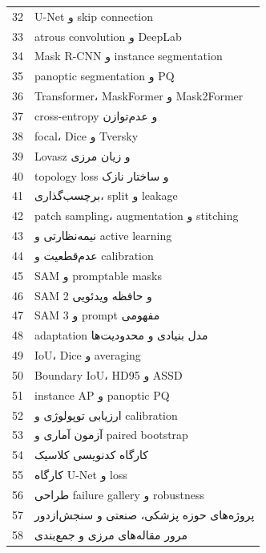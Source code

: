 \documentclass[12pt,openany,oneside]{book}
\begin{document}
\begin{longtable}{p{12mm}p{115mm}}
32 & U-Net و skip connection \\
33 & atrous convolution و DeepLab \\
34 & Mask R-CNN و instance segmentation \\
35 & panoptic segmentation و PQ \\
36 & Transformer، MaskFormer و Mask2Former \\
37 & cross-entropy و عدم‌توازن \\
38 & focal، Dice و Tversky \\
39 & Lovasz و زیان مرزی \\
40 & topology loss و ساختار نازک \\
41 & برچسب‌گذاری، split و leakage \\
42 & patch sampling، augmentation و stitching \\
43 & نیمه‌نظارتی و active learning \\
44 & عدم‌قطعیت و calibration \\
45 & SAM و promptable masks \\
46 & SAM 2 و حافظه ویدئویی \\
47 & SAM 3 و prompt مفهومی \\
48 & adaptation مدل بنیادی و محدودیت‌ها \\
49 & IoU، Dice و averaging \\
50 & Boundary IoU، HD95 و ASSD \\
51 & instance AP و panoptic PQ \\
52 & ارزیابی توپولوژی و calibration \\
53 & آزمون آماری و paired bootstrap \\
54 & کارگاه کدنویسی کلاسیک \\
55 & کارگاه U-Net و loss \\
56 & طراحی failure gallery و robustness \\
57 & پروژه‌های حوزه پزشکی، صنعتی و سنجش‌ازدور \\
58 & مرور مقاله‌های مرزی و جمع‌بندی \\
\bottomrule
\end{longtable}
\end{document}
